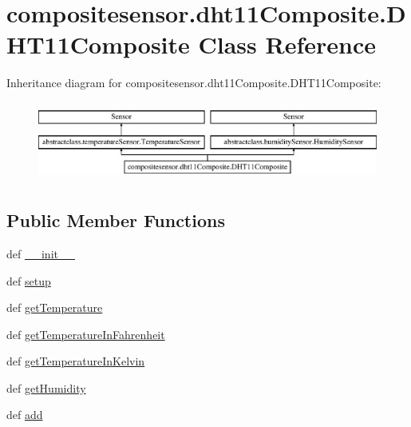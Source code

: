 \hypertarget{classcompositesensor_1_1dht11Composite_1_1DHT11Composite}{}\section{compositesensor.\+dht11\+Composite.\+D\+H\+T11\+Composite Class Reference}
\label{classcompositesensor_1_1dht11Composite_1_1DHT11Composite}
Inheritance diagram for compositesensor.\+dht11\+Composite.\+D\+H\+T11\+Composite\+:\begin{figure}[H]
\begin{center}
\leavevmode
\includegraphics[height=2.625000cm]{classcompositesensor_1_1dht11Composite_1_1DHT11Composite}
\end{center}
\end{figure}
\subsection*{Public Member Functions}
\begin{DoxyCompactItemize}
\item 
def \hyperlink{classcompositesensor_1_1dht11Composite_1_1DHT11Composite_a97ab4fe23ef6b1f7503bd10890a3bcd0}{\+\_\+\+\_\+init\+\_\+\+\_\+}
\item 
def \hyperlink{classcompositesensor_1_1dht11Composite_1_1DHT11Composite_a80f9c838ff5e7f5f70224374568a7b2f}{setup}
\item 
def \hyperlink{classcompositesensor_1_1dht11Composite_1_1DHT11Composite_ad5d0f0720564ced49be30d6ec8a392ec}{get\+Temperature}
\item 
def \hyperlink{classcompositesensor_1_1dht11Composite_1_1DHT11Composite_a69ea0a6b20dd7f03d042e3d21bec7390}{get\+Temperature\+In\+Fahrenheit}
\item 
def \hyperlink{classcompositesensor_1_1dht11Composite_1_1DHT11Composite_a179dd9d30ea127afd2e75681adfb9584}{get\+Temperature\+In\+Kelvin}
\item 
def \hyperlink{classcompositesensor_1_1dht11Composite_1_1DHT11Composite_afbd10fa00ace3a25d4ff990a5630aa71}{get\+Humidity}
\item 
def \hyperlink{classcompositesensor_1_1dht11Composite_1_1DHT11Composite_a98098f47167b0bb02378bbd358047107}{add}
\end{DoxyCompactItemize}
